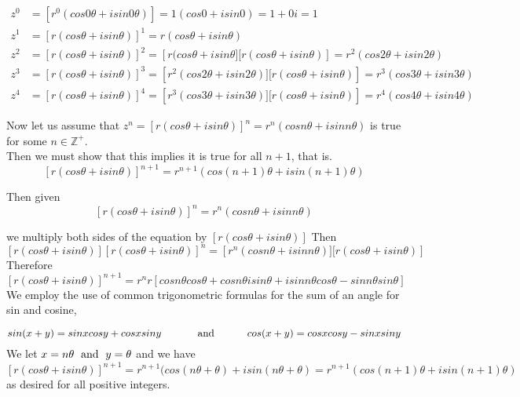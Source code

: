 \documentclass{article}
\begin{document}
\begin{align*}
    z^0 &= \left[r^0(cos0\theta + isin0\theta)\right] = 1(cos0 + isin0) = 1 + 0i = 1 \\ 
    z^1 &= \left[r(cos\theta + isin\theta)\right]^1 = r(cos\theta + isin\theta) \\ 
    z^2 &= \left[r(cos\theta + isin\theta)\right]^2 = \left[r(cos\theta + isin\theta][r(cos\theta + isin\theta)\right] = r^2(cos2\theta + isin2\theta) \\ 
    z^3 &= \left[r(cos\theta + isin\theta)\right]^3 = \left[r^2(cos2\theta + isin2\theta)][r(cos\theta + isin\theta)\right] = r^3(cos3\theta + isin3\theta) \\ 
    z^4 &= \left[r(cos\theta + isin\theta)\right]^4 = \left[r^3(cos3\theta + isin3\theta)][r(cos\theta + isin\theta)\right] = r^4(cos4\theta + isin4\theta) 
\end{align*}  

Now let us assume that $z^n = \left[r(cos\theta + isin\theta)\right]^n = r^n(cosn\theta + isinn\theta)$ is true for some \(n \in \mathds{Z}^+\). \\ 
Then we must show that this implies it is true for all \(n + 1\), that is. \[\left[r(cos\theta + isin\theta)\right]^{n + 1} = r^{n + 1}(cos(n + 1)\theta + isin(n + 1)\theta)\]  

Then given \[\left[r(cos\theta + isin\theta)\right]^n = r^n(cosn\theta + isinn\theta)\] 

we multiply both sides of the equation by \(\left[r(cos\theta + isin\theta)\right]\) Then \[\left[r(cos\theta + isin\theta)\right]\left[r(cos\theta + isin\theta)\right]^n = \left[r^n(cosn\theta + isinn\theta)][r(cos\theta + isin\theta)\right]\] Therefore 
\[\left[r(cos\theta + isin\theta)\right]^{n + 1} = r^nr\left[cos{n\theta}cos{\theta} + cos{n\theta}isin\theta + isin{n\theta}cos\theta - sin{n\theta}sin\theta\right]\] 
We employ the use of common trigonometric formulas for the sum of an angle for sin and cosine, 

$$sin(x + y) = sinxcosy + cosxsiny \text{ \hspace{1cm} and \hspace{1cm}} cos(x + y) = cosxcosy - sinxsiny$$ We let \(x = n\theta \text{\hspace{.1cm} and \hspace{.1cm}} y = \theta\) and we have \[\left[r(cos\theta + isin\theta)\right]^{n + 1} = r^{n + 1}(cos(n\theta + \theta) + isin(n\theta + \theta) = r^{n + 1}(cos(n + 1)\theta + isin(n + 1)\theta)\] as desired for all positive integers. \\
\vspace{.1cm}
\end{document}

